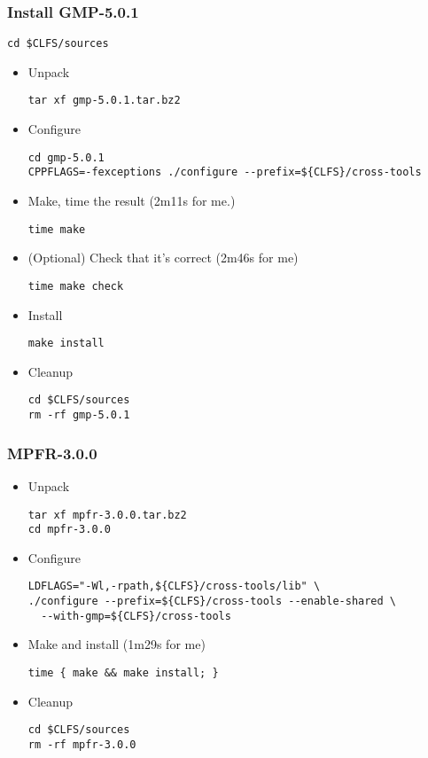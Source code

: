  \subsubsection{Install GMP-5.0.1}
 \begin{lstlisting}
cd $CLFS/sources
 \end{lstlisting}
 \begin{itemize}
\item Unpack
  \begin{lstlisting}
tar xf gmp-5.0.1.tar.bz2
  \end{lstlisting}

\item Configure
  \begin{lstlisting}
cd gmp-5.0.1
CPPFLAGS=-fexceptions ./configure --prefix=${CLFS}/cross-tools
  \end{lstlisting}
\item Make, time the result (2m11s for me.)
\begin{lstlisting}
time make 
\end{lstlisting}
\item (Optional) Check that it's correct (2m46s for me)
  \begin{lstlisting}
time make check
  \end{lstlisting}
\item Install
  \begin{lstlisting}
make install
  \end{lstlisting}
\item Cleanup
  \begin{lstlisting}
cd $CLFS/sources
rm -rf gmp-5.0.1
  \end{lstlisting}
 \end{itemize}
 \subsubsection{MPFR-3.0.0}
 \begin{itemize}
  \item Unpack
    \begin{lstlisting}
tar xf mpfr-3.0.0.tar.bz2
cd mpfr-3.0.0
    \end{lstlisting}
  \item Configure
   \begin{lstlisting}
LDFLAGS="-Wl,-rpath,${CLFS}/cross-tools/lib" \
./configure --prefix=${CLFS}/cross-tools --enable-shared \
  --with-gmp=${CLFS}/cross-tools
   \end{lstlisting}
  \item Make and install (1m29s for me)
   \begin{lstlisting}
time { make && make install; }
   \end{lstlisting}
  \item Cleanup
   \begin{lstlisting}
cd $CLFS/sources
rm -rf mpfr-3.0.0
    \end{lstlisting}
 \end{itemize}

